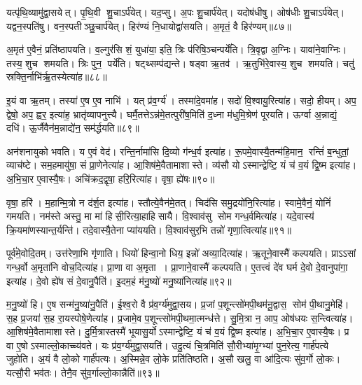 यत्पृ॑थि॒व्यामु॑द्वा॒सयेत्। पृ॒थि॒वी शु॒चाऽर्प॑येत्। यद॒प्सु। अ॒पः  शु॒चार्प॑येत्। यदोष॑धीषु। ओष॑धीः  शु॒चाऽर्प॑येत्। यद्वन॒स्पति॑षु। वन॒स्पतीञ्छु॒चार्प॑येत्। हिर॑ण्यं नि॒धायोद्वा॑सयति। अ॒मृतं॒ वै हिर॑ण्यम्॥८७॥

अ॒मृत॑ ए॒वैनं॒ प्रति॑ष्ठापयति। व॒ल्गुर॑सि शं॒ युधा॑या॒ इति॒ त्रिः प॑रिषि॒ञ्चन्पर्ये॑ति। त्रि॒वृद्वा अ॒ग्निः। यावा॑ने॒वाग्निः। तस्य॒ शुच शमयति। त्रिः पुन॒ पर्ये॑ति। षट्थ्सम्प॑द्यन्ते। षड्वा ऋ॒तव॑। ऋ॒तुभि॑रे॒वास्य॒ शुच शमयति। चतु॑ स्रक्ति॒र्नाभि॑र्\mbox{}ऋ॒तस्येत्या॑ह॥८८॥

इ॒यं वा ऋ॒तम्। तस्या॑ ए॒ष ए॒व नाभि॑। यत् प्र॑व॒र्ग्य॑। तस्मा॑दे॒वमा॑ह। सदो॑ वि॒श्वायु॒रित्या॑ह। सदो॒ हीयम्। अप॒ द्वेषो॒ अप॒ ह्वर॒ इत्या॑ह॒ भ्रातृ॑व्यापनुत्त्यै। घर्मै॒तत्तेऽन्न॑मे॒तत्पुरी॑ष॒मिति॑ द॒ध्ना म॑धुमि॒श्रेण॑ पूरयति। ऊर्ग्वा अ॒न्नाद्यं॒ दधि॑। ऊ॒र्जैवैन॑म॒न्नाद्ये॑न॒ सम॑र्द्धयति॥८९॥

अन॑शनायुको भवति। य ए॒वं वेद॑। रन्ति॒र्नामा॑सि दि॒व्यो ग॑न्ध॒र्व इत्या॑ह। रू॒पमे॒वास्यै॒तन्म॑हि॒मान॒ रन्तिं॑ ब॒न्धुतां॒ व्याच॑ष्टे। सम॒हमायु॑षा॒ सं प्रा॒णेनेत्या॑ह। आ॒शिष॑मे॒वैतामाशास्ते। व्य॑सौ योऽस्मान्द्वेष्टि॒ यं च॑ व॒यं द्वि॒ष्म इत्या॑ह। अ॒भि॒चा॒र ए॒वास्यै॒षः। अचि॑क्रद॒द्वृषा॒ हरि॒रित्या॑ह। वृषा॒ ह्ये॑षः॥९०॥

वृषा॒ हरि॑। म॒हान्मि॒त्रो न द॑र्\mbox{}श॒त इत्या॑ह। स्तौत्ये॒वैन॑मे॒तत्। चिद॑सि समु॒द्रयो॑नि॒रित्या॑ह। स्वामे॒वैनं॒ योनिं॑ गमयति। नम॑स्ते अस्तु॒ मा मा॑ हिसी॒रित्या॒हाहिसायै। वि॒श्वाव॑सु सोम गन्ध॒र्वमित्या॑ह। यदे॒वास्य॑ क्रि॒यमा॑णस्यान्त॒र्यन्ति॑। तदे॒वास्यै॒तेना प्या॑ययति। वि॒श्वाव॑सुर॒भि तन्नो॑ गृणा॒त्वि\-त्या॑ह॥९१॥

पूर्व॑मे॒वोदि॒तम्। उत्त॑रेणा॒भि गृ॑णाति। धियो॑ हिन्वा॒नो धिय॒ इन्नो॑ अव्या॒दित्या॑ह। ऋ॒तूने॒वास्मै॑ कल्पयति। प्राऽऽसां गन्ध॒र्वो अ॒मृता॑नि वोच॒दित्या॑ह। प्रा॒णा वा अ॒मृता। प्रा॒णाने॒वास्मै॑ कल्पयति। ए॒तत्त्वं दे॑व घर्म दे॒वो दे॒वानुपा॑गा॒ इत्या॑ह। दे॒वो ह्ये॑ष सं दे॒वानु॒पैति॑। इ॒दम॒हं म॑नु॒ष्यो॑ मनु॒ष्या॑नित्या॑ह॥९२॥

म॒नु॒ष्यो॑ हि। ए॒ष सन्म॑नु॒ष्या॑नु॒पैति॑। ई॒श्व॒रो वै प्र॑व॒र्ग्य॑मुद्वा॒सय\sn{}। प्र॒जां प॒शून्त्सो॑मपी॒थम॑नू॒द्वास॒ सोम॑ पी॒थानु॒मेहि॑। स॒ह प्र॒जया॑ स॒ह रा॒यस्पोषे॒णेत्या॑ह। प्र॒जामे॒व प॒शून्त्सो॑मपी॒थमा॒त्मन्ध॑त्ते। सु॒मि॒त्रा न॒ आप॒ ओष॑धयः स॒न्त्वित्या॑ह। आ॒शिष॑मे॒वैतामाशास्ते। दु॒र्मि॒त्रास्तस्मै॑ भूयासु॒र्योऽस्मान्द्वेष्टि॒ यं च॑ व॒यं द्वि॒ष्म इत्या॑ह। अ॒भि॒चा॒र ए॒वास्यै॒षः। प्र वा ए॒षोऽस्माल्लो॒काच्च्य॑वते। यः प्र॑व॒र्ग्य॑मुद्वा॒सयति॑। उदु॒त्यं चि॒त्रमिति॑ सौ॒रीभ्या॑मृ॒ग्भ्यां पुन॒रेत्य॒ गार्\mbox{}ह॑पत्ये जुहोति। अ॒यं वै लो॒को गार्\mbox{}ह॑पत्यः। अ॒स्मिन्ने॒व लो॒के प्रति॑तिष्ठति। अ॒सौ खलु॒ वा आ॑दि॒त्यः सु॑व॒र्गो लो॒कः। यत्सौ॒री भव॑तः। तेनै॒व सु॑व॒र्गाल्लो॒कान्नैति॑॥९३॥
\anuvakamend[ब्रह्म॑णस्त्वा पर॒स्पाया॒ इत्या॑ह दधात्य॒न्वित्य॑ रक्ष॒स्वी रक्ष॑सा॒मप॑हत्यै॒ वै हिर॑ण्यमाहार्द्धयति॒ ह्ये॑ष गृ॑णा॒त्वित्या॑ह मनु॒ष्या॑नित्या॑हास्यै॒षोऽष्टौ च॑]

